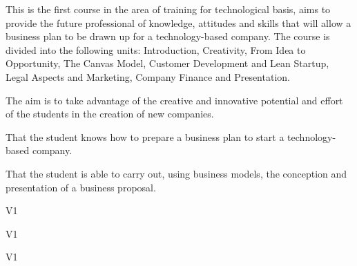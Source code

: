 \begin{syllabus}


\begin{justification}
   This is the first course in the area of training for
   technological basis, aims to provide the future professional 
   of knowledge, attitudes and skills that will
   allow a business plan to be drawn up for a technology-based company.
   The course is divided into the following units:
   Introduction, Creativity, From Idea to Opportunity, The Canvas Model, Customer Development and Lean Startup, Legal Aspects and Marketing, Company Finance and Presentation.
   
   The aim is to take advantage of the creative and innovative potential and effort of the students in the creation of new companies.
\end{justification}

\begin{goals}
   \item That the student knows how to prepare a business plan to start a technology-based company.
   \item That the student is able to carry out, using business models, the conception and presentation of a business proposal.
\end{goals}

\begin{outcomes}{V1}
   \item {}
   \item {}
   \item {}
\end{outcomes}

\begin{specificoutcomes}{V1}
    \item {}
    \item {}
    \item {}
    \item {}
\end{specificoutcomes}
   
\begin{competences}{V1}
    \item {}
    \item {}
    \item {}
    \item {}
    \item {}
    \item {}
    \item {}
    \item {}
\end{competences}
   

\end{syllabus}
